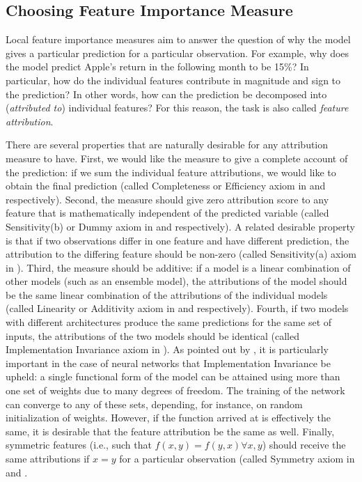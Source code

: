 				
		\subsection{Choosing Feature Importance Measure}
			\label{chap:feature_importance_lit}
			Local feature importance measures aim to answer the question of why the model gives a particular prediction for a particular observation. For example, why does the model predict Apple's return in the following month to be 15\%? In particular, how do the individual features contribute in magnitude and sign to the prediction? In other words, how can the prediction be decomposed into (\textit{attributed to}) individual features? For this reason, the task is also called \textit{feature attribution}.  
			
			There are several properties that are naturally desirable for any attribution measure to have. First, we would like the measure to give a complete account of the prediction: if we sum the individual feature attributions, we would like to obtain the final prediction (called Completeness or Efficiency axiom in \cite{sundararajan2017axiomatic} and \cite{molnar2020interpretable} respectively). Second, the measure should give zero attribution score to any feature that is mathematically independent of the predicted variable (called Sensitivity(b) or Dummy axiom in \cite{sundararajan2017axiomatic} and \cite{molnar2020interpretable} respectively). A related desirable property is that if two observations differ in one feature and have different prediction, the attribution to the differing feature should be non-zero (called Sensitivity(a) axiom in \cite{sundararajan2017axiomatic}). Third, the measure should be additive: if a model is a linear combination of other models (such as an ensemble model), the attributions of the model should be the same linear combination of the attributions of the individual models (called Linearity or Additivity axiom in \cite{sundararajan2017axiomatic} and \cite{molnar2020interpretable} respectively). Fourth, if two models with different architectures produce the same predictions for the same set of inputs, the attributions of the two models should be identical (called Implementation Invariance axiom in \cite{sundararajan2017axiomatic}). As pointed out by \cite{sundararajan2017axiomatic}, it is particularly important in the case of neural networks that Implementation Invariance be upheld: a single functional form of the model can be attained using more than one set of weights due to many degrees of freedom. The training of the network can converge to any of these sets, depending, for instance, on random initialization of weights. However, if the function arrived at is effectively the same, it is desirable that the feature attribution be the same as well. Finally, symmetric features (i.e., such that $f(x,y) = f(y,x) \forall x, y$) should receive the same attributions if $x=y$ for a particular observation (called Symmetry axiom in \cite{shrikumar2017learning} and  \cite{molnar2020interpretable}. 
			
